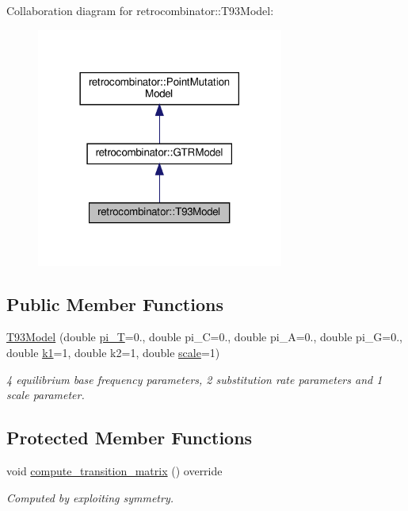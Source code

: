 Collaboration diagram for retrocombinator\+:\+:T93\+Model\+:\nopagebreak
\begin{figure}[H]
\begin{center}
\leavevmode
\includegraphics[width=230pt]{classretrocombinator_1_1T93Model__coll__graph}
\end{center}
\end{figure}
\subsection*{Public Member Functions}
\begin{DoxyCompactItemize}
\item 
\hyperlink{classretrocombinator_1_1T93Model_ad857daf369e1d16fc8233b08dc0deef8}{T93\+Model} (double \hyperlink{classretrocombinator_1_1GTRModel_ab002dbc62f8e8fbfc94558dd94166bd8}{pi\+\_\+T}=0., double pi\+\_\+C=0., double pi\+\_\+A=0., double pi\+\_\+G=0., double \hyperlink{classretrocombinator_1_1T93Model_a6844211aebb1deb555fa6f9b11b9d395}{k1}=1, double k2=1, double \hyperlink{classretrocombinator_1_1PointMutationModel_a3258dfbdae0f2614cdc66f13ae028b46}{scale}=1)
\begin{DoxyCompactList}\small\item\em 4 equilibrium base frequency parameters, 2 substitution rate parameters and 1 scale parameter. \end{DoxyCompactList}\end{DoxyCompactItemize}
\subsection*{Protected Member Functions}
\begin{DoxyCompactItemize}
\item 
\mbox{\label{classretrocombinator_1_1T93Model_aaa8c96927a1ff3b8c611f0d0f9d6f36a}} 
void \hyperlink{classretrocombinator_1_1T93Model_aaa8c96927a1ff3b8c611f0d0f9d6f36a}{compute\+\_\+transition\+\_\+matrix} () override
\begin{DoxyCompactList}\small\item\em Computed by exploiting symmetry. \end{DoxyCompactList}\end{DoxyCompactItemize}
